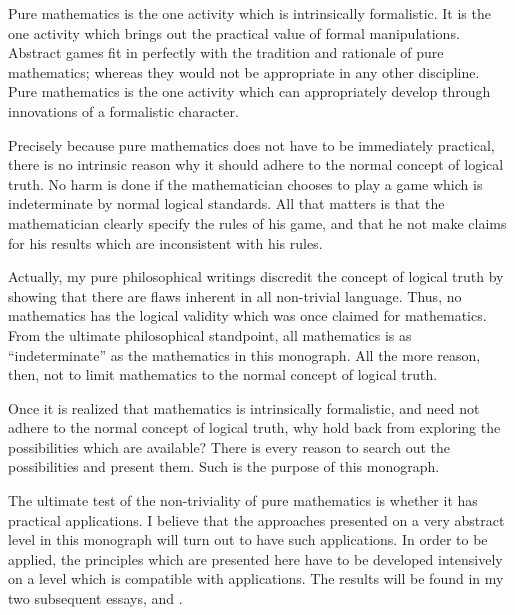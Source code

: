 
Pure mathematics is the one activity which is intrinsically formalistic. It is the one activity which brings out the practical value of formal manipulations. Abstract games fit in perfectly with the tradition and rationale of pure mathematics; whereas they would not be appropriate in any other discipline. Pure mathematics is the one activity which can appropriately develop through innovations of a formalistic character. 

Precisely because pure mathematics does not have to be immediately practical, there is no intrinsic reason why it should adhere to the normal concept of logical truth. No harm is done if the mathematician chooses to play a game which is indeterminate by normal logical standards. All that matters is that the mathematician clearly specify the rules of his game, and that he not make claims for his results which are inconsistent with his rules. 

Actually, my pure philosophical writings discredit the concept of logical truth by showing that there are flaws inherent in all non-trivial language. Thus, no mathematics has the logical validity which was once claimed for mathematics. From the ultimate philosophical standpoint, all mathematics is as \enquote{indeterminate} as the mathematics in this monograph. All the more reason, then, not to limit mathematics to the normal concept of logical truth. 

Once it is realized that mathematics is intrinsically formalistic, and need not adhere to the normal concept of logical truth, why hold back from exploring the possibilities which are available? There is every reason to search out the possibilities and present them. Such is the purpose of this monograph. 

The ultimate test of the non-triviality of pure mathematics is whether it has practical applications. I believe that the approaches presented on a very abstract level in this monograph will turn out to have such applications. In order to be applied, the principles which are presented here have to be developed intensively on a level which is compatible with applications. The results will be found in my two subsequent essays,  and .

